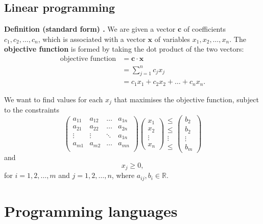 \subsection{Linear programming}
\begin{shaded}
\textbf{Definition (standard form) \cite{clrs_algorithms}.} We are given a vector $\mathbf{c}$ of coefficients $c_1, c_2, \ldots, c_n$, which is associated with a vector $\mathbf{x}$ of variables $x_1, x_2, \ldots, x_n$. The \textbf{objective function} is formed by taking the dot product of the two vectors:
\begin{align*}
\text{objective function} &= \mathbf{c} \cdot \mathbf{x} \\
&= \sum_{j=1}^{n} c_j x_j \\
&= c_1 x_1 + c_2 x_2 + \ldots + c_n x_n .
\end{align*}

We want to find values for each $x_j$ that maximises the objective function, subject to the constraints
$$
\begin{pmatrix}
a_{11} & a_{12} & \ldots & a_{1n} \\
a_{21} & a_{22} & \ldots & a_{2n} \\
\vdots & \vdots & \ddots & a_{1n} \\
a_{m1} & a_{m2} & \ldots & a_{mn} \\
\end{pmatrix}
\begin{pmatrix} x_1 \\ x_2 \\ \vdots \\ x_n \end{pmatrix}
\begin{matrix} \leq \\ \leq \\ \vdots \\ \leq \end{matrix}
\begin{pmatrix} b_2 \\ b_2 \\ \vdots \\ b_m \end{pmatrix}
$$
and
$$ x_j \geq 0 , $$
for $i = 1, 2, \ldots, m$ and $j = 1, 2, \ldots, n$, where $a_{ij}, b_i \in \mathbb{R}$.

\end{shaded}

\section{Programming languages}

